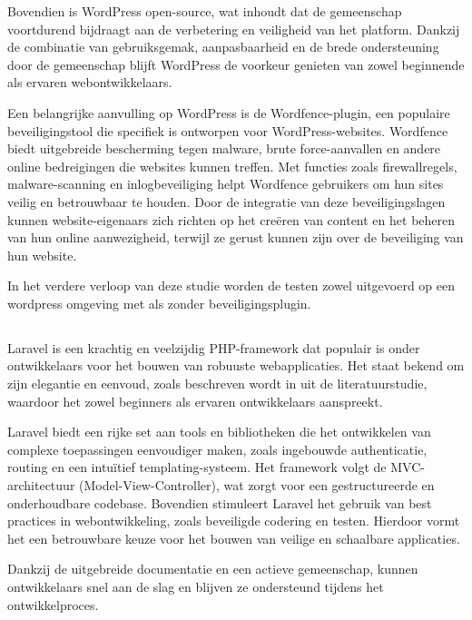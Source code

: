 Bovendien is WordPress open-source, wat inhoudt dat de 
gemeenschap voortdurend bijdraagt aan de verbetering en veiligheid van het platform. Dankzij de combinatie van gebruiksgemak, 
aanpasbaarheid en de brede ondersteuning door de gemeenschap blijft WordPress de voorkeur genieten van zowel beginnende als 
ervaren webontwikkelaars.

Een belangrijke aanvulling op WordPress is de Wordfence-plugin, een populaire beveiligingstool die specifiek is ontworpen 
voor WordPress-websites. Wordfence biedt uitgebreide bescherming tegen malware, brute force-aanvallen en andere online 
bedreigingen die websites kunnen treffen. Met functies zoals firewallregels, malware-scanning en inlogbeveiliging helpt 
Wordfence gebruikers om hun sites veilig en betrouwbaar te houden. Door de integratie van deze beveiligingslagen kunnen 
website-eigenaars zich richten op het creëren van content en het beheren van hun online aanwezigheid, terwijl ze gerust 
kunnen zijn over de beveiliging van hun website.

In het verdere verloop van deze studie worden de testen zowel uitgevoerd op een wordpress omgeving met als zonder 
beveiligingsplugin.

\subsection{}
Laravel is een krachtig en veelzijdig PHP-framework dat populair is onder ontwikkelaars voor het bouwen van robuuste 
webapplicaties. Het staat bekend om zijn elegantie en eenvoud, zoals beschreven wordt in  
uit de literatuurstudie, waardoor het zowel beginners als ervaren ontwikkelaars aanspreekt. 

Laravel biedt een rijke set aan tools en bibliotheken die het ontwikkelen van complexe toepassingen eenvoudiger 
maken, zoals ingebouwde authenticatie, routing en een intuïtief templating-systeem. Het framework volgt de MVC-architectuur 
(Model-View-Controller), wat zorgt voor een gestructureerde en onderhoudbare codebase. Bovendien stimuleert Laravel het 
gebruik van best practices in webontwikkeling, zoals beveiligde codering en testen. Hierdoor vormt het een betrouwbare keuze 
voor het bouwen van veilige en schaalbare applicaties. 

Dankzij de uitgebreide documentatie en een actieve gemeenschap, kunnen 
ontwikkelaars snel aan de slag en blijven ze ondersteund tijdens het ontwikkelproces.

